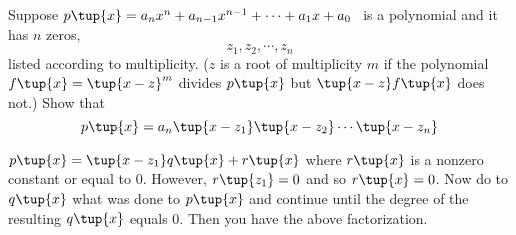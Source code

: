 \begin{enumialphparenastyle}
\begin{ex} Suppose $p\tup{x} =a_{n}x^{n}+a_{n-1}x^{n-1}+\cdots
+a_{1}x+a_{0}$ \ is a polynomial and it has $n$ zeros,
\begin{equation*}
z_{1},z_{2},\cdots ,z_{n}
\end{equation*}
listed according to multiplicity. ($z$ is a root of multiplicity $m$ if the
polynomial $f\tup{x} =\tup{x-z} ^{m}$ divides $p\tup{
x} $ but $\tup{x-z} f\tup{x} $ does not.) Show that
\begin{equation*}
p\tup{x} =a_{n}\tup{x-z_{1}} \tup{x-z_{2}} \cdots
\tup{x-z_{n}} 
\end{equation*} 
\begin{sol}
$p\tup{x} =\tup{x-z_{1}} q\tup{x} +r\tup{x} $
where $r\tup{x} $ is a nonzero constant or equal to $0$. However, $r\tup{z_{1}} =0$ and so $r\tup{x} =0$. Now do to $q\tup{
x} $ what was done to $p\tup{x} $ and continue until the
degree of the resulting $q\tup{x} $ equals $0$. Then you have the
above factorization.
\end{sol}
\end{ex}

\end{enumialphparenastyle}